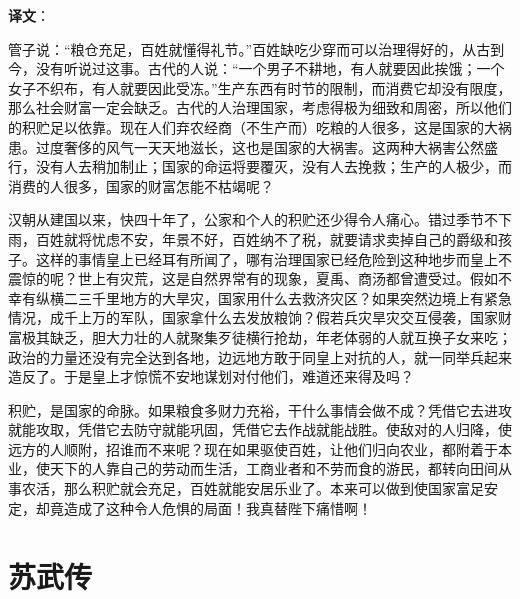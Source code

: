 \documentclass[12pt,UTF-8,openany,a4]{ctexbook}
\begin{document}
\newpage

\begin{Large}
   \noindent \textbf{译文}：
\end{Large}

\vspace{1em}

\begin{large}\yiwen
    
    管子说：“粮仓充足，百姓就懂得礼节。”百姓缺吃少穿而可以治理得好的，从古到今，没有听说过这事。古代的人说：“一个男子不耕地，有人就要因此挨饿；一个女子不织布，有人就要因此受冻。”生产东西有时节的限制，而消费它却没有限度，那么社会财富一定会缺乏。古代的人治理国家，考虑得极为细致和周密，所以他们的积贮足以依靠。现在人们弃农经商（不生产而）吃粮的人很多，这是国家的大祸患。过度奢侈的风气一天天地滋长，这也是国家的大祸害。这两种大祸害公然盛行，没有人去稍加制止；国家的命运将要覆灭，没有人去挽救；生产的人极少，而消费的人很多，国家的财富怎能不枯竭呢？
    
    汉朝从建国以来，快四十年了，公家和个人的积贮还少得令人痛心。错过季节不下雨，百姓就将忧虑不安，年景不好，百姓纳不了税，就要请求卖掉自己的爵级和孩子。这样的事情皇上已经耳有所闻了，哪有治理国家已经危险到这种地步而皇上不震惊的呢？世上有灾荒，这是自然界常有的现象，夏禹、商汤都曾遭受过。假如不幸有纵横二三千里地方的大旱灾，国家用什么去救济灾区？如果突然边境上有紧急情况，成千上万的军队，国家拿什么去发放粮饷？假若兵灾旱灾交互侵袭，国家财富极其缺乏，胆大力壮的人就聚集歹徒横行抢劫，年老体弱的人就互换子女来吃；政治的力量还没有完全达到各地，边远地方敢于同皇上对抗的人，就一同举兵起来造反了。于是皇上才惊慌不安地谋划对付他们，难道还来得及吗？
    
    积贮，是国家的命脉。如果粮食多财力充裕，干什么事情会做不成？凭借它去进攻就能攻取，凭借它去防守就能巩固，凭借它去作战就能战胜。使敌对的人归降，使远方的人顺附，招谁而不来呢？现在如果驱使百姓，让他们归向农业，都附着于本业，使天下的人靠自己的劳动而生活，工商业者和不劳而食的游民，都转向田间从事农活，那么积贮就会充足，百姓就能安居乐业了。本来可以做到使国家富足安定，却竟造成了这种令人危惧的局面！我真替陛下痛惜啊！
    

\end{large}



\chapter{苏武传}
\end{document}
